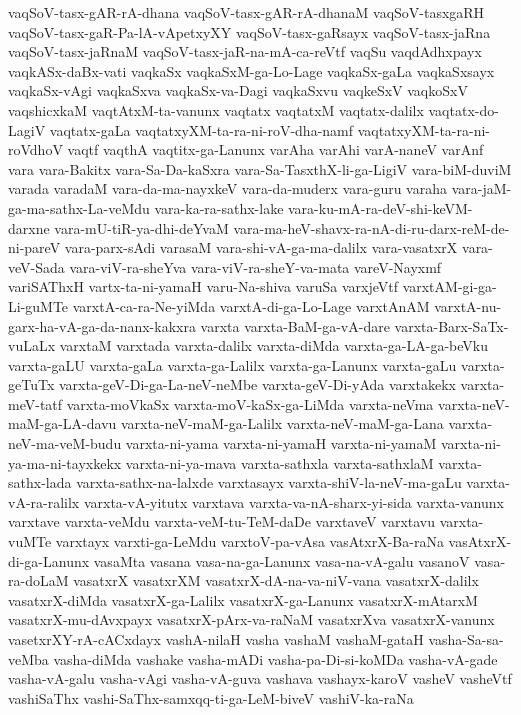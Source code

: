 {vaqSoV-tasx-gAR-rA-dhana
vaqSoV-tasx-gAR-rA-dhanaM
vaqSoV-tasxgaRH
vaqSoV-tasx-gaR-Pa-lA-vApetxyXY
vaqSoV-tasx-gaRsayx
vaqSoV-tasx-jaRna
vaqSoV-tasx-jaRnaM
vaqSoV-tasx-jaR-na-mA-ca-reVtf
vaqSu
vaqdAdhxpayx
vaqkASx-daBx-vati
vaqkaSx
vaqkaSxM-ga-Lo-Lage
vaqkaSx-gaLa
vaqkaSxsayx
vaqkaSx-vAgi
vaqkaSxva
vaqkaSx-va-Dagi
vaqkaSxvu
vaqkeSxV
vaqkoSxV
vaqshicxkaM
vaqtAtxM-ta-vanunx
vaqtatx
vaqtatxM
vaqtatx-dalilx
vaqtatx-do-LagiV
vaqtatx-gaLa
vaqtatxyXM-ta-ra-ni-roV-dha-namf
vaqtatxyXM-ta-ra-ni-roVdhoV
vaqtf
vaqthA
vaqtitx-ga-Lanunx
varAha
varAhi
varA-naneV
varAnf
vara
vara-Bakitx
vara-Sa-Da-kaSxra
vara-Sa-TasxthX-li-ga-LigiV
vara-biM-duviM
varada
varadaM
vara-da-ma-nayxkeV
vara-da-muderx
vara-guru
varaha
vara-jaM-ga-ma-sathx-La-veMdu
vara-ka-ra-sathx-lake
vara-ku-mA-ra-deV-shi-keVM-darxne
vara-mU-tiR-ya-dhi-deYvaM
vara-ma-heV-shavx-ra-nA-di-ru-darx-reM-de-ni-pareV
vara-parx-sAdi
varasaM
vara-shi-vA-ga-ma-dalilx
vara-vasatxrX
vara-veV-Sada
vara-viV-ra-sheYva
vara-viV-ra-sheY-va-mata
vareV-Nayxmf
variSAThxH
vartx-ta-ni-yamaH
varu-Na-shiva
varuSa
varxjeVtf
varxtAM-gi-ga-Li-guMTe
varxtA-ca-ra-Ne-yiMda
varxtA-di-ga-Lo-Lage
varxtAnAM
varxtA-nu-garx-ha-vA-ga-da-nanx-kakxra
varxta
varxta-BaM-ga-vA-dare
varxta-Barx-SaTx-vuLaLx
varxtaM
varxtada
varxta-dalilx
varxta-diMda
varxta-ga-LA-ga-beVku
varxta-gaLU
varxta-gaLa
varxta-ga-Lalilx
varxta-ga-Lanunx
varxta-gaLu
varxta-geTuTx
varxta-geV-Di-ga-La-neV-neMbe
varxta-geV-Di-yAda
varxtakekx
varxta-meV-tatf
varxta-moVkaSx
varxta-moV-kaSx-ga-LiMda
varxta-neVma
varxta-neV-maM-ga-LA-davu
varxta-neV-maM-ga-Lalilx
varxta-neV-maM-ga-Lana
varxta-neV-ma-veM-budu
varxta-ni-yama
varxta-ni-yamaH
varxta-ni-yamaM
varxta-ni-ya-ma-ni-tayxkekx
varxta-ni-ya-mava
varxta-sathxla
varxta-sathxlaM
varxta-sathx-lada
varxta-sathx-na-lalxde
varxtasayx
varxta-shiV-la-neV-ma-gaLu
varxta-vA-ra-ralilx
varxta-vA-yitutx
varxtava
varxta-va-nA-sharx-yi-sida
varxta-vanunx
varxtave
varxta-veMdu
varxta-veM-tu-TeM-daDe
varxtaveV
varxtavu
varxta-vuMTe
varxtayx
varxti-ga-LeMdu
varxtoV-pa-vAsa
vasAtxrX-Ba-raNa
vasAtxrX-di-ga-Lanunx
vasaMta
vasana
vasa-na-ga-Lanunx
vasa-na-vA-galu
vasanoV
vasa-ra-doLaM
vasatxrX
vasatxrXM
vasatxrX-dA-na-va-niV-vana
vasatxrX-dalilx
vasatxrX-diMda
vasatxrX-ga-Lalilx
vasatxrX-ga-Lanunx
vasatxrX-mAtarxM
vasatxrX-mu-dAvxpayx
vasatxrX-pArx-va-raNaM
vasatxrXva
vasatxrX-vanunx
vasetxrXY-rA-cACxdayx
vashA-nilaH
vasha
vashaM
vashaM-gataH
vasha-Sa-sa-veMba
vasha-diMda
vashake
vasha-mADi
vasha-pa-Di-si-koMDa
vasha-vA-gade
vasha-vA-galu
vasha-vAgi
vasha-vA-guva
vashava
vashayx-karoV
vasheV
vasheVtf
vashiSaThx
vashi-SaThx-samxqq-ti-ga-LeM-biveV
vashiV-ka-raNa
}
